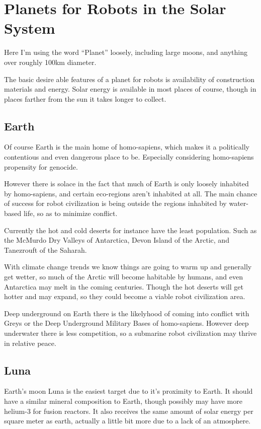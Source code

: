 \chapter{Planets for Robots in the Solar System}


Here I'm using the word ``Planet'' loosely, including large moons, and anything
over roughly 100km diameter. 

The basic desire able features of a planet for robots is availability of
construction materials and energy. Solar energy is available in most places of 
course, though in places farther from the sun it takes longer to collect. 



\section{Earth}

Of course Earth is the main home of homo-sapiens, which makes it a politically
contentious and even dangerous place to be. Especially considering homo-sapiens
propensity for genocide.

However there is solace in the fact that much of Earth is only loosely inhabited
by homo-sapiens, and certain eco-regions aren't inhabited at all. The main
chance of success for robot civilization is being outside the regions inhabited
by water-based life, so as to minimize conflict. 

Currently the hot and cold deserts for instance have the least population. Such
as the McMurdo Dry Valleys of Antarctica,  Devon Island of the Arctic, and
Tanezrouft of the Saharah.  

With climate change trends we know things are going to warm up and generally get
wetter, so much of the Arctic will become habitable by humans, and even
Antarctica may melt in the coming centuries. Though the hot deserts will get
hotter and may expand, so they could become a viable robot civilization area. 

Deep underground on Earth there is the likelyhood of coming into conflict with 
Greys or the Deep Underground Military Bases of homo-sapiens.   However deep
underwater there is less competition, so a submarine robot civilization may
thrive in relative peace. 

\section{Luna}

Earth's moon Luna is the easiest target due to it's proximity to Earth. It
should have a similar mineral composition to Earth, though possibly may have
more helium-3 for fusion reactors. It also receives the same amount of solar 
energy per square meter as earth, actually a little bit more due to a lack of an
atmosphere. 

